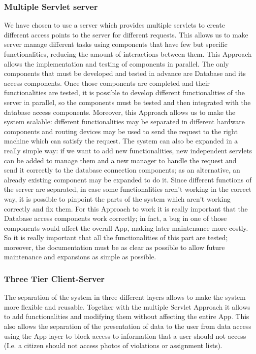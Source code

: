 \subsubsection{Multiple Servlet server}
We have chosen to use a server which provides multiple servlets to create different access points to the server for different requests. This allows us to make server manage different tasks using components that have few but specific functionalities, reducing the amount of interactions between them.
This Approach allows the implementation and testing of components in parallel. The only components that must be developed and tested in advance are Database and its access components.
 Once those components are completed and their functionalities are tested, it is possible to develop different functionalities of the server in parallel, so the components must be tested and then integrated with the database access components. Moreover, this Approach allows us to make the system scalable: different functionalities may be separated in different hardware components and  routing devices may be used to send the request to the right machine which can satisfy the request.
 The system can also be expanded in a really simple way: if we want to add new functionalities, new independent servlets can be added to manage them and a new manager to handle the request and send it correctly to the database connection components; as an alternative, an already existing component may be expanded to do it. Since different functions of the server are separated, in case some functionalities aren’t working in the correct way, it is possible to pinpoint the parts of the system which aren’t working correctly and fix them. For this Approach to work it is really important that the Database access components work correctly; in fact, a bug in one of those components would affect the overall App, making later maintenance more costly. So it is really important that all the functionalities of this part are tested; moreover, the documentation must be as clear as possible to allow future maintenance and expansions as simple as possible.
\subsubsection{Three Tier Client-Server}
The separation of the system in three different layers allows to make the system more flexible and
reusable. Together with the multiple Servlet Approach it allows to add functionalities and modifying them
without affecting the entire App. This also allows the separation of the presentation of data to the user
from data access using the App layer to block access to information that a user should not access (I.e. a
citizen should not access photos of violations or assignment lists).


